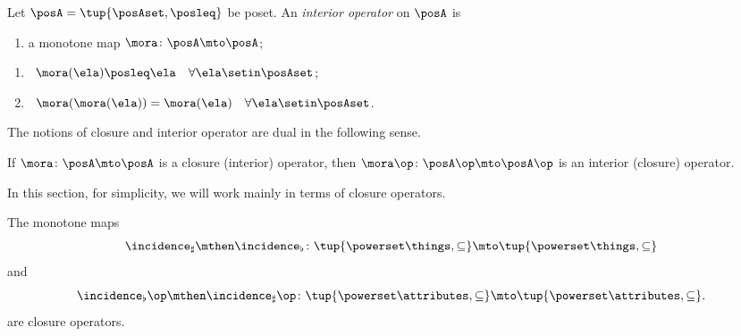 \begin{definition}\label{def:interior-operator}
Let $\posA = \tup{\posAset, \posleq}$ be poset. An \emph{interior operator} on $\posA$ is

\constit
\begin{enumerate}
\item a monotone map $\mora \colon \posA \mto \posA$; 
\end{enumerate}

\condit
\begin{enumerate}
\item {} \  $\mora(\ela) \posleq \ela \quad \forall \ela \setin \posAset$;
\item {} \ $\mora (\mora(\ela)) =  \mora(\ela) \quad \forall \ela \setin \posAset$. 
\end{enumerate}
\end{definition}

The notions of closure and interior operator are dual in the following sense. 

\begin{lemma}
If $\mora \colon \posA \mto \posA$ is a closure (interior) operator, then $\mora\op \colon \posA\op \mto \posA\op$ is an interior (closure) operator. 
\end{lemma}

In this section, for simplicity, we will work mainly in terms of closure operators. 

\begin{lemma}\label{lem:cfa-closure-operators}
The monotone maps 
\begin{equation}
\incidence_\sharp \mthen \incidence_\flat \colon \tup{\powerset \things, \subseteq} \mto \tup{\powerset \things, \subseteq}
\end{equation}
and 
\begin{equation}
\incidence_\flat\op \mthen \incidence_\sharp\op \colon \tup{\powerset \attributes, \subseteq} \mto \tup{\powerset \attributes, \subseteq}.
\end{equation}
are closure operators. 
\end{lemma}


